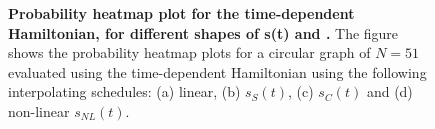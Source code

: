 \begin{figure}[ht]
  \caption{\textbf{Probability heatmap plot for the time-dependent Hamiltonian, for different shapes of s(t) and .} The figure shows the probability heatmap plots for a circular graph of $N=51$ evaluated using the time-dependent Hamiltonian using the following interpolating schedules: (a) linear, (b) $s_S(t)$, (c) $s_C(t)$ and (d) non-linear $s_{NL}(t)$.}
  \label{fig:heatmap_time_dependent}
\end{figure}

